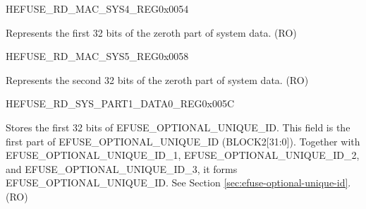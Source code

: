 \begin{register}{H}{EFUSE\_RD\_MAC\_SYS4\_REG}{0x0054}\label{regdesc:EFUSERDMACSYS4REG}
%
\regnewline%
\begin{regdesc}\begin{reglist}
\label{fielddesc:EFUSESYSDATAPART01}\item [EFUSE\_SYS\_DATA\_PART0\_1] Represents the first 32 bits of the zeroth part of system data. (RO)
\end{reglist}\end{regdesc}
\end{register}


\begin{register}{H}{EFUSE\_RD\_MAC\_SYS5\_REG}{0x0058}\label{regdesc:EFUSERDMACSYS5REG}
%
\regnewline%
\begin{regdesc}\begin{reglist}
\label{fielddesc:EFUSESYSDATAPART02}\item [EFUSE\_SYS\_DATA\_PART0\_2] Represents the second 32 bits of the zeroth part of system data. (RO)
\end{reglist}\end{regdesc}
\end{register}


\begin{register}{H}{EFUSE\_RD\_SYS\_PART1\_DATA0\_REG}{0x005C}\label{regdesc:EFUSERDSYSPART1DATA0REG}\label{regdesc:EFUSERDSYSPART1DATANREG}
%
\regnewline%
\begin{regdesc}\begin{reglist}
\label{fielddesc:EFUSEOPTIONALUNIQUEID}\item [EFUSE\_OPTIONAL\_UNIQUE\_ID] Stores the first 32 bits of EFUSE\_OPTIONAL\_UNIQUE\_ID. This field is the first part of EFUSE\_OPTIONAL\_UNIQUE\_ID (BLOCK2[31:0]). Together with EFUSE\_OPTIONAL\_UNIQUE\_ID\_1, EFUSE\_OPTIONAL\_UNIQUE\_ID\_2, and EFUSE\_OPTIONAL\_UNIQUE\_ID\_3, it forms EFUSE\_OPTIONAL\_UNIQUE\_ID. See Section \ref{sec:efuse-optional-unique-id}. (RO)
\end{reglist}\end{regdesc}
\end{register}


